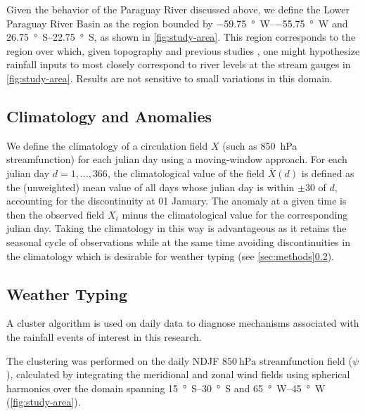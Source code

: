 \documentclass[twocol]{ametsoc}
\begin{document}
Given the behavior of the Paraguay River discussed above, we define the Lower Paraguay River Basin as the region bounded by \SIrange{-59.75}{-55.75}{\degree W} and \SIrange{26.75}{22.75}{\degree S}, as shown in \cref{fig:study-area}.
This region corresponds to the region over which, given topography and previous studies \citep{Barros:2004bn,Bravo:2011et}, one might hypothesize rainfall inputs to most closely correspond to river levels at the stream gauges in \cref{fig:study-area}.
Results are not sensitive to small variations in this domain.

\subsection{Climatology and Anomalies} \label{sec:climatology-anomalies}

We define the climatology of a circulation field $X$ (such as \SI{850}{\hecto\pascal} streamfunction) for each julian day using a moving-window approach.
For each julian day $d = 1, \ldots, 366$, the climatological value of the field $\overline{X}(d)$ is defined as the (unweighted) mean value of all days whose julian day is within $\pm 30$ of $d$, accounting for the discontinuity at 01 January.
The anomaly at a given time is then the observed field $X_i$ minus the climatological value for the corresponding julian day.
Taking the climatology in this way is advantageous as it retains the seasonal cycle of observations while at the same time avoiding discontinuities in the climatology which is desirable for weather typing (see \cref{sec:methods}\ref{sec:weather-typing}).

\subsection{Weather Typing} \label{sec:weather-typing}

A cluster algorithm is used on daily data to diagnose mechanisms associated with the rainfall events of interest in this research.

The clustering was performed on the daily NDJF $\SI{850}{\hecto\pascal}$ streamfunction field ($\psi$), calculated by integrating the meridional and zonal wind fields using spherical harmonics \citep{Dawson:2016ws,Adams:1999fb} over the domain spanning \SIrange{15}{30}{\degree S} and \SIrange{65}{45}{\degree W} (\cref{fig:study-area}).
\end{document}
